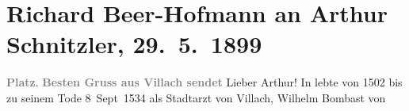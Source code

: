 

         
         \renewcommand{\erwaehntePersonen}{Personen: Richard Beer-Hofmann, Wilhelm Bombast von Hohenheim, Theofrastus Bombastus Paracelsus}
         \renewcommand{\erwaehnteOrte}{Orte: Villach, Wien}
         \renewcommand{\erwaehnteWerke}{Werke: Der grüne Kakadu. Groteske in einem Akt}
               \section[Richard Beer-Hofmann an Arthur Schnitzler, 29. 5. 1899]{ Richard Beer-Hofmann an Arthur Schnitzler, 29. 5. 1899}\nopagebreak{}\rehead{ }\begin{ledgroupsized}[t]{13cm}\normalsize\beginnumbering{} \toendnotes[C]{\smallbreak\pagebreak[2]} 
\toendnotes[C]{\smallbreak}\pstart
           \noindent{}\centering{}{\pb}\textcolor{gray}{\textbf{Platz}}.\pend
           \pstart
           \noindent{}\centering{}\textcolor{gray}{\textbf{{\pb}Besten Gruss aus Villach
                     sendet}}\pend
           \pstart\center{}Lieber Arthur!\pend\pstart
           In \label{T_L00919-1v}\label{T_L00919-1h} lebte von 1502 bis zu seinem
               Tode 8 Sept 1534 als Stadtarzt von Villach, Wilhelm Bombast von

\end{ledgroupsized}
